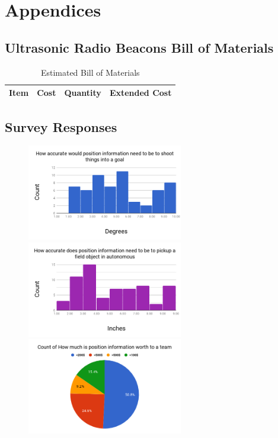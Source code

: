 \documentclass{article}
\begin{document}




\section{Appendices}

  \subsection{Ultrasonic Radio Beacons Bill of Materials} \label{appendix:beacon_bom}

    \begin{table}[H]
      \centering
      \begin{tabular}{|c|c|c|c|} \hline
        Item & Cost & Quantity & Extended Cost \\ \hline
      \end{tabular}
      \caption{Estimated Bill of Materials}
      \label{table:beacon_bom}
    \end{table}

  \subsection{Survey Responses}\label{appendix:survey}

    \begin{figure}[H]
      \centering
      \includegraphics[height=4.2cm]{./images/survey_angle.png}
      \includegraphics[height=4.2cm]{./images/survey_position.png}
      \includegraphics[height=4.2cm]{./images/survey_worth.png}
      \label{fig:survey_imgs}
    \end{figure}
\end{document}
